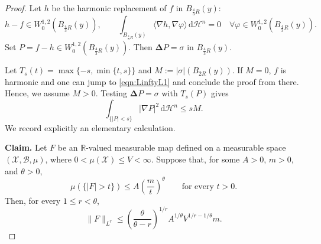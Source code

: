 \documentclass[12pt,a4paper,reqno]{amsart}
\renewcommand{\leq}{\leqslant}
\begin{document}
\begin{proof}
Let $h$ be the harmonic replacement of $f$ in $B_{\frac{4}{3}R}(y)$:
\[
 h-f\in W^{1,2}_0(B_{\frac{4}{3}R}(y)),\qquad
 \int_{B_{\frac{4}{3}R}(y)}\langle \nabla h,\nabla\varphi\rangle\,\mathrm{d}\mathcal{H}^n=0
 \quad\forall \varphi\in W^{1,2}_0(B_{\frac{4}{3}R}(y)).
\]
Set $P=f-h\in W^{1,2}_0(B_{\frac{4}{3}R}(y))$.  Then
$\mathbf{\Delta} P=\sigma$ in $B_{\frac{4}{3}R}(y)$. 

Let $T_s(t)=\max\{-s,\min\{t,s\}\}$ and
$M:=|\sigma|(B_{2R}(y))$. If $M=0$, $f$ is harmonic and one can jump to \eqref{eqn:LinftyL1} and conclude the proof from there. Hence, we assume $M>0$.  Testing $\mathbf{\Delta} P=\sigma$ with $T_s(P)$ gives
\begin{equation}\label{eq:truncation-energy}
 \int_{\{|P|<s\}}|\nabla P|^2\,\mathrm{d}\mathcal{H}^n
 \leq sM.
\end{equation}
We record explicitly an elementary calculation.
\smallskip

\textbf{Claim.}
Let $F$ be an $\mathbb R$-valued measurable map defined on a measurable space $(\mathcal{X},\mathcal{B},\mu)$,  where $0<\mu(\mathcal{X})\leq V<\infty$.  Suppose that,
for some $A>0$, $m>0$, and $\theta>0$,
\[
 \mu(\{|F|>t\})\leq A\left(\frac mt\right)^\theta
 \qquad\text{for every }t>0.
\]
Then, for every $1\leq r<\theta$,
\begin{equation}\label{eq:weak-to-strong}
 \|F\|_{L^r}
 \leq
 \left(\frac{\theta}{\theta-r}\right)^{1/r}
 A^{1/\theta}V^{1/r-1/\theta}m.
\end{equation}


\end{proof}
\end{document}
